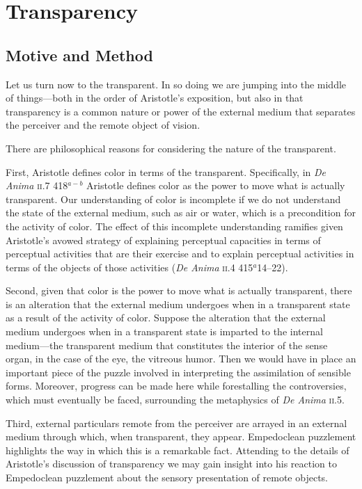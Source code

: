 \chapter{Transparency} %
\label{cha:transparency}

\section{Motive and Method} %
\label{sec:motive_and_method}

Let us turn now to the transparent. In so doing we are jumping into the middle of things---both in the order of Aristotle's exposition, but also in that transparency is a common nature or power of the external medium that separates the perceiver and the remote object of vision.

There are philosophical reasons for considering the nature of the transparent.

First, Aristotle defines color in terms of the transparent. Specifically, in \emph{De Anima} \textsc{ii}.7 418\( ^{a-b} \) Aristotle defines color as the power to move what is actually transparent. Our understanding of color is incomplete if we do not understand the state of the external medium, such as air or water, which is a precondition for the activity of color. The effect of this incomplete understanding ramifies given Aristotle's avowed strategy of explaining perceptual capacities in terms of perceptual activities that are their exercise and to explain perceptual activities in terms of the objects of those activities (\emph{De Anima} \textsc{ii}.4 415\( ^{a} \)14--22).

Second, given that color is the power to move what is actually transparent, there is an alteration that the external medium undergoes when in a transparent state as a result of the activity of color. Suppose the alteration that the external medium undergoes when in a transparent state is imparted to the internal medium---the transparent medium that constitutes the interior of the sense organ, in the case of the eye, the vitreous humor. Then we would have in place an important piece of the puzzle involved in interpreting the assimilation of sensible forms. Moreover, progress can be made here while forestalling the controversies, which must eventually be faced, surrounding the metaphysics of \emph{De Anima} \textsc{ii}.5.

Third, external particulars remote from the perceiver are arrayed in an external medium through which, when transparent, they appear. Empedoclean puzzlement highlights the way in which this is a remarkable fact. Attending to the details of Aristotle's discussion of transparency we may gain insight into his reaction to Empedoclean puzzlement about the sensory presentation of remote objects.

